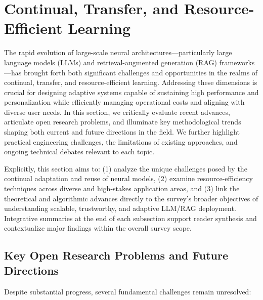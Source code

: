 \documentclass[sigconf]{acmart}
\begin{document}
\section{Continual, Transfer, and Resource-Efficient Learning}

The rapid evolution of large-scale neural architectures—particularly large language models (LLMs) and retrieval-augmented generation (RAG) frameworks—has brought forth both significant challenges and opportunities in the realms of continual, transfer, and resource-efficient learning. Addressing these dimensions is crucial for designing adaptive systems capable of sustaining high performance and personalization while efficiently managing operational costs and aligning with diverse user needs. In this section, we critically evaluate recent advances, articulate open research problems, and illuminate key methodological trends shaping both current and future directions in the field. We further highlight practical engineering challenges, the limitations of existing approaches, and ongoing technical debates relevant to each topic.

Explicitly, this section aims to: (1) analyze the unique challenges posed by the continual adaptation and reuse of neural models, (2) examine resource-efficiency techniques across diverse and high-stakes application areas, and (3) link the theoretical and algorithmic advances directly to the survey’s broader objectives of understanding scalable, trustworthy, and adaptive LLM/RAG deployment. Integrative summaries at the end of each subsection support reader synthesis and contextualize major findings within the overall survey scope.

\subsection{Key Open Research Problems and Future Directions}

Despite substantial progress, several fundamental challenges remain unresolved:
\end{document}
